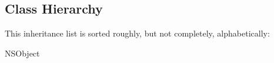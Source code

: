 \subsection{Class Hierarchy}
This inheritance list is sorted roughly, but not completely, alphabetically\-:\begin{DoxyCompactList}
\item {}
\item N\-S\-Object\begin{DoxyCompactList}
\item {}
\begin{DoxyCompactList}
\item {}
\item {}
\end{DoxyCompactList}
\item {}
\item {}
\end{DoxyCompactList}
\end{DoxyCompactList}
